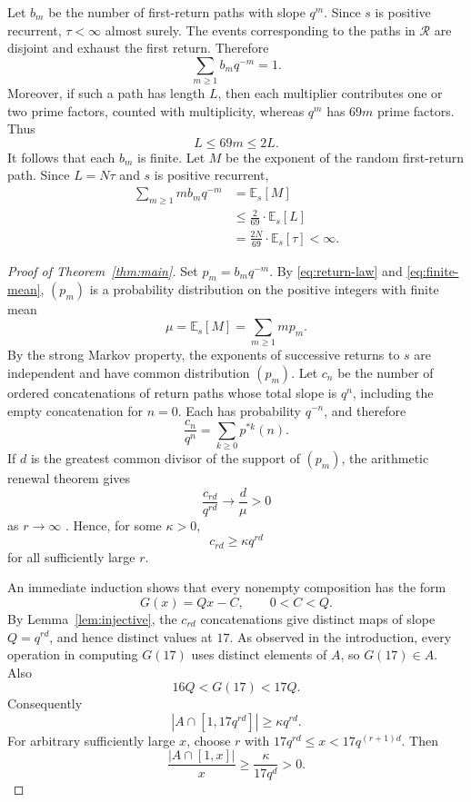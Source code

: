 \documentclass[11pt]{article}
\newcommand{\thmref}[1]{Theorem~\ref{#1}}
\newcommand{\lemref}[1]{Lemma~\ref{#1}}
\begin{document}
Let $b_m$ be the number of first-return paths with slope $q^m$. Since $s$ is positive recurrent, $\tau<\infty$ almost surely. The events corresponding to the paths in $\mathcal R$ are disjoint and exhaust the first return. Therefore
\begin{equation}\label{eq:return-law}
\sum_{m\geq1}b_mq^{-m}=1.
\end{equation}
Moreover, if such a path has length $L$, then each multiplier contributes one or two prime factors, counted with multiplicity, whereas $q^m$ has $69m$ prime factors. Thus
\[
L\leq69m\leq2L.
\]
It follows that each $b_m$ is finite. Let $M$ be the exponent of the random first-return path. Since $L=N\tau$ and $s$ is positive recurrent,
\begin{equation}\label{eq:finite-mean}
\begin{aligned}
\sum_{m\geq1}mb_mq^{-m}
&=\mathbb E_s\left[M\right]\\
&\leq\frac2{69}\cdot\mathbb E_s\left[L\right]\\
&=\frac{2N}{69}\cdot\mathbb E_s\left[\tau\right]
<\infty.
\end{aligned}
\end{equation}

\begin{proof}[Proof of \thmref{thm:main}]
Set $p_m=b_mq^{-m}$. By \eqref{eq:return-law} and \eqref{eq:finite-mean}, $(p_m)$ is a probability distribution on the positive integers with finite mean
\[
\mu=\mathbb E_s\left[M\right]=\sum_{m\geq1}mp_m.
\]
By the strong Markov property, the exponents of successive returns to $s$ are independent and have common distribution $(p_m)$. Let $c_n$ be the number of ordered concatenations of return paths whose total slope is $q^n$, including the empty concatenation for $n=0$. Each has probability $q^{-n}$, and therefore
\[
\frac{c_n}{q^n}=\sum_{k\geq0}p^{*k}(n).
\]
If $d$ is the greatest common divisor of the support of $(p_m)$, the arithmetic renewal theorem gives
\[
\frac{c_{rd}}{q^{rd}}\longrightarrow\frac d\mu>0
\]
as $r\to\infty$ \cite[Chapter XI, Section 1, p.~358]{Feller}. Hence, for some $\kappa>0$,
\[
c_{rd}\geq\kappa q^{rd}
\]
for all sufficiently large $r$.

An immediate induction shows that every nonempty composition has the form
\[
G(x)=Qx-C,
\qquad 0<C<Q.
\]
By \lemref{lem:injective}, the $c_{rd}$ concatenations give distinct maps of slope $Q=q^{rd}$, and hence distinct values at $17$. As observed in the introduction, every operation in computing $G(17)$ uses distinct elements of $A$, so $G(17)\in A$. Also
\[
16Q<G(17)<17Q.
\]
Consequently
\[
|A\cap[1,17q^{rd}]|\geq\kappa q^{rd}.
\]
For arbitrary sufficiently large $x$, choose $r$ with
$17q^{rd}\leq x<17q^{(r+1)d}$. Then
\[
\frac{|A\cap[1,x]|}{x}\geq\frac{\kappa}{17q^d}>0.
\]
\end{proof}
\end{document}
